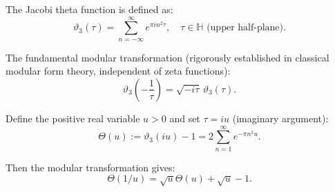 \begin{definition}
\label{def:jacobiTheta}

The Jacobi theta function is defined as:
\begin{equation}
\vartheta_3(\tau) = \sum_{n=-\infty}^\infty e^{\pi i n^2 \tau}, \quad \tau \in \mathbb{H} \text{ (upper half-plane)}.
\end{equation}

The fundamental modular transformation (rigorously established in classical modular form theory, independent of zeta functions):
\begin{equation}
\vartheta_3\left(-\frac{1}{\tau}\right) = \sqrt{-i\tau} \, \vartheta_3(\tau).
\end{equation}

Define the positive real variable $u > 0$ and set $\tau = iu$ (imaginary argument):
\begin{equation}
\Theta(u) := \vartheta_3(iu) - 1 = 2\sum_{n=1}^{\infty} e^{-\pi n^2 u}.
\end{equation}

Then the modular transformation gives:
\begin{equation}
\Theta(1/u) = \sqrt{u}\Theta(u) + \sqrt{u} - 1.
\end{equation}

\end{definition}

